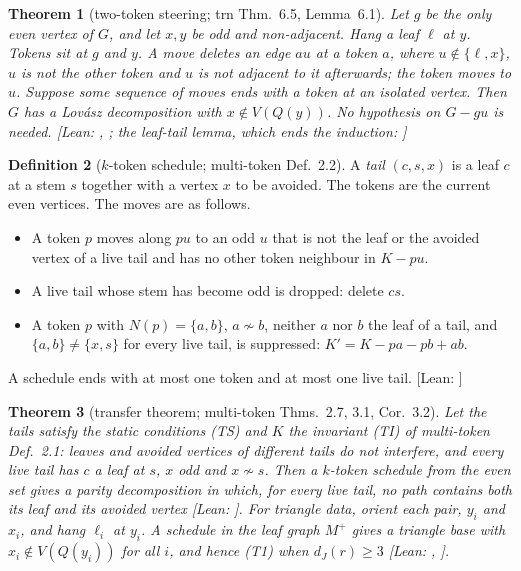 \documentclass[11pt]{amsart}
\newtheorem{theorem}{Theorem}[section]
\theoremstyle{definition}
\newtheorem{definition}[theorem]{Definition}
\newcommand{\st}[1]{\textsf{\small[#1]}}
\begin{document}
\begin{theorem}[two-token steering; trn Thm.~6.5, Lemma~6.1]\label{thm:steer2}
Let $g$ be the only even vertex of $G$, and let $x,y$ be odd and non-adjacent. Hang a leaf $\ell$ at $y$.
Tokens sit at $g$ and $y$. A move deletes an edge $au$ at a token $a$, where $u\notin\{\ell,x\}$, $u$ is not
the other token and $u$ is not adjacent to it afterwards; the token moves to $u$. Suppose some sequence of
moves ends with a token at an isolated vertex. Then $G$ has a Lov\'asz decomposition with
$x\notin V(Q(y))$. No hypothesis on $G-gu$ is needed. \st{Lean: , ;
the leaf-tail lemma, which ends the induction: \lean{avoid_leafTail}}
\end{theorem}

\begin{definition}[$k$-token schedule; multi-token Def.~2.2]\label{def:steerK}
A \emph{tail} $(c,s,x)$ is a leaf $c$ at a stem $s$ together with a vertex $x$ to be avoided. The tokens
are the current even vertices. The moves are as follows.
\begin{itemize}[leftmargin=*]
\item[(M)] A token $p$ moves along $pu$ to an odd $u$ that is not the leaf or the avoided vertex of a live
tail and has no other token neighbour in $K-pu$.
\item[(D)] A live tail whose stem has become odd is dropped: delete $cs$.
\item[(S)] A token $p$ with $N(p)=\{a,b\}$, $a\not\sim b$, neither $a$ nor $b$ the leaf of a tail, and
$\{a,b\}\ne\{x,s\}$ for every live tail, is suppressed: $K'=K-pa-pb+ab$.
\end{itemize}
A schedule ends with at most one token and at most one live tail. \st{Lean: }
\end{definition}

\begin{theorem}[transfer theorem; multi-token Thms.~2.7, 3.1, Cor.~3.2]\label{thm:steerK}
Let the tails satisfy the static conditions (TS) and $K$ the invariant (TI) of multi-token Def.~2.1:
leaves and avoided vertices of different tails do not interfere, and every live tail has $c$ a leaf at
$s$, $x$ odd and $x\not\sim s$. Then a $k$-token schedule from the even set gives a parity decomposition in which, for every live tail, no
path contains both its leaf and its avoided vertex \st{Lean: }. For triangle data,
orient each pair, $y_i$ and $x_i$, and hang $\ell_i$ at $y_i$. A schedule in the leaf graph $M^+$ gives a
triangle base with $x_i\notin V(Q(y_i))$ for all $i$, and hence (T1) when $d_J(r)\ge3$
\st{Lean: , \lean{test1At_of_steerK}}.
\end{theorem}
\end{document}
